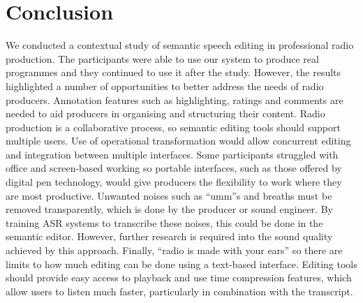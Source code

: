 \section{Conclusion}\label{sec:screen-conclusion}
We conducted a contextual study of semantic speech editing in professional radio production. The participants were able
to use our system to produce real programmes and they continued to use it after the study.  However, the results
highlighted a number of opportunities to better address the needs of radio producers.
Annotation features such as highlighting, ratings and comments are needed to aid producers in organising and
structuring their content.
Radio production is a collaborative process, so semantic editing tools should support multiple users. Use of
operational transformation would allow concurrent editing and integration between multiple interfaces.
Some participants struggled with office and screen-based working so portable interfaces, such as those offered by
digital pen technology, would give producers the flexibility to work where they are most productive. 
Unwanted noises such as ``umm''s and breaths must be removed transparently, which is done by the producer or sound
engineer. By training ASR systems to transcribe these noises, this could be done in the semantic editor.
However, further research is required into the sound quality achieved by this approach.
Finally, ``radio is made with your ears'' so there are limits to how much editing can be done using a text-based
interface. Editing tools should provide easy access to playback and use time compression features, which allow users to
listen much faster, particularly in combination with the transcript.



